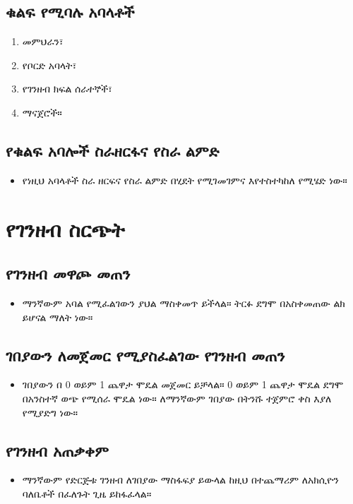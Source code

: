 \documentclass[a4paper,12pt]{article}
\newenvironment{geez}{\geezfont}{}
\begin{document}
\subsection{\begin{geez}ቁልፍ የሚባሉ አባላቶች\end{geez}}  
\begin{enumerate}
\item መምህራን፣
\item የቦርድ አባላት፣
\item የገንዘብ ክፍል ሰራተኞች፣
\item ማናጀሮች።
\end{enumerate}
\subsection{\begin{geez}የቁልፍ አባሎች ስራዘርፋና የስራ ልምድ\end{geez}}  
\begin{itemize}
\item የነዚህ አባላቶች ስራ ዘርፍና የስራ ልምድ በሂደት የሚገመገምና እየተስተካከለ የሚሄድ ነው።
\end{itemize}
\section{\begin{geez}የገንዘብ ስርጭት\end{geez}}  
\subsection{\begin{geez}የገንዘብ መዋጮ መጠን\end{geez}}  
\begin{itemize}
\item ማንኛውም አባል የሚፈልገውን ያህል ማስቀመጥ ይችላል። ትርፉ ደግሞ በአስቀመጠው ልክ ይሆናል ማለት ነው።
\end{itemize}
\subsection{\begin{geez}ገበያውን ለመጀመር የሚያስፈልገው የገንዘብ መጠን\end{geez}}  
\begin{itemize}
\item ገበያውን በ 0 ወይም 1 ጨዋታ ሞዴል መጀመር ይቻላል። 0 ወይም 1 ጨዋታ ሞዴል ደግሞ በአንስተኛ ወጭ የሚሰራ ሞዴል ነው። ለማንኛውም ገበያው በትንሹ ተጀምሮ ቀስ እያለ የሚያድግ ነው። 
\end{itemize}
\subsection{\begin{geez}የገንዘብ አጠቃቀም\end{geez}}  
\begin{itemize}
\item ማንኛውም የድርጅቱ ገንዘብ ለገበያው ማስፋፍያ ይውላል ከዚህ በተጨማሪም ለአክሲዮን ባለቤቶች በፈለጉት ጊዜ ይከፋፈላል።
\end{itemize}
\end{document}
